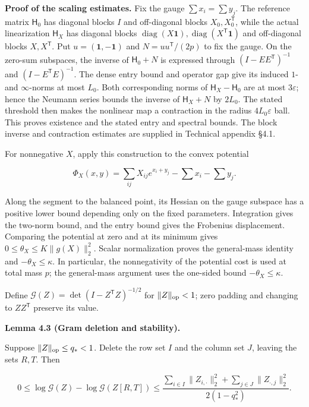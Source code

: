 \documentclass[11pt,a4paper]{article}
\begin{document}
\textbf{Proof of the scaling estimates.} Fix the gauge \(\sum x_i=\sum y_j\). The reference matrix \(\mathsf H_0\) has diagonal blocks \(I\) and off-diagonal blocks \(X_0,X_0^{\mathsf T}\), while the actual linearization \(\mathsf H_X\) has diagonal blocks \(\operatorname{diag}(X\mathbf1),\operatorname{diag}(X^{\mathsf T}\mathbf1)\) and off-diagonal blocks \(X,X^{\mathsf T}\). Put \(u=(\mathbf1,-\mathbf1)\) and \(N=uu^{\mathsf T}/(2p)\) to fix the gauge. On the zero-sum subspaces, the inverse of \(\mathsf H_0+N\) is expressed through \((I-EE^{\mathsf T})^{-1}\) and \((I-E^{\mathsf T}E)^{-1}\). The dense entry bound and operator gap give its induced \(1\)- and \(\infty\)-norms at most \(L_0\). Both corresponding norms of \(\mathsf H_X-\mathsf H_0\) are at most \(3\varepsilon\); hence the Neumann series bounds the inverse of \(\mathsf H_X+N\) by \(2L_0\). The stated threshold then makes the nonlinear map a contraction in the radius \(4L_0\varepsilon\) ball. This proves existence and the stated entry and spectral bounds. The block inverse and contraction estimates are supplied in Technical appendix §4.1.

For nonnegative \(X\), apply this construction to the convex potential

\[
\Phi_X(x,y)=\sum_{ij}X_{ij}e^{x_i+y_j}-\sum x_i-\sum y_j.
\]

Along the segment to the balanced point, its Hessian on the gauge subspace has a positive lower bound depending only on the fixed parameters. Integration gives the two-norm bound, and the entry bound gives the Frobenius displacement. Comparing the potential at zero and at its minimum gives \(0\le\theta_X\le K\|g(X)\|_2^2\). Scalar normalization proves the general-mass identity and \(-\theta_X\le\kappa\). In particular, the nonnegativity of the potential cost is used at total mass \(p\); the general-mass argument uses the one-sided bound \(-\theta_X\le\kappa\).

Define \(\mathcal G(Z)=\det(I-Z^{\mathsf T}Z)^{-1/2}\) for \(\|Z\|_{\rm op}<1\); zero padding and changing to \(ZZ^{\mathsf T}\) preserve its value.

\textbf{Lemma 4.3 (Gram deletion and stability).}

Suppose \(\|Z\|_{\rm op}\le q_*<1\). Delete the row set \(I\) and the column set \(J\), leaving the sets \(R,T\). Then

\[
0\le\log\mathcal G(Z)-\log\mathcal G(Z[R,T])\le\frac{\sum_{i\in I}\|Z_{i,\cdot}\|_2^2+\sum_{j\in J}\|Z_{\cdot,j}\|_2^2}{2(1-q_*^2)}.
\]
\end{document}
